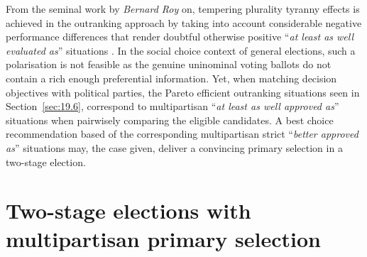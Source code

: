From the seminal work by \emph{Bernard Roy} on, tempering plurality tyranny effects is achieved in the outranking approach by taking into account considerable negative performance differences that render doubtful otherwise positive ``\emph{at least as well evaluated as}'' situations \citep*{ROY-1966}. In the social choice context of general elections, such a polarisation is not feasible as the genuine uninominal voting ballots do not contain a rich enough preferential information. Yet, when matching decision objectives with political parties, the Pareto efficient outranking situations seen in Section~\ref{sec:19.6}, correspond to multipartisan ``\emph{at least as well approved as}'' situations when pairwisely comparing the eligible candidates. A best choice recommendation based of the corresponding multipartisan strict ``\emph{better approved as}'' situations may, the case given, deliver a convincing primary selection in a two-stage election. 

\section{Two-stage elections with multipartisan primary selection}
\label{sec:20.1}

